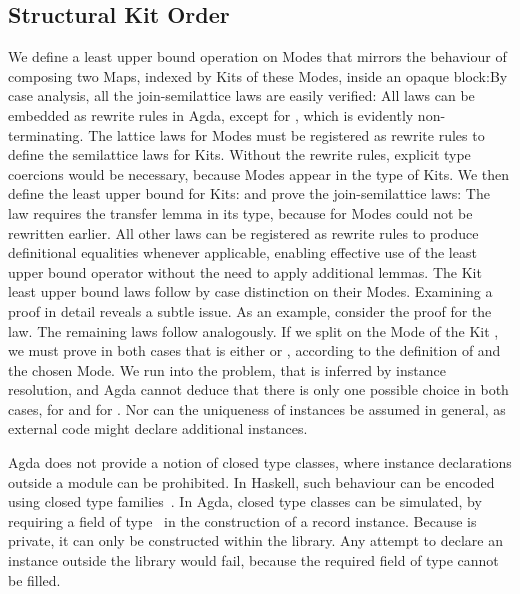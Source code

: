 \documentclass[screen,nonacm]{acmart}
\begin{document}
\subsection{Structural Kit Order}\label{sec:ags-sko}
We define a least upper bound operation on Modes that mirrors the behaviour of
composing two Maps, indexed by Kits of these Modes, inside an opaque
block:\AModeLub{}By case analysis, all the join-semilattice laws are easily
verified: \AModeLubLaws{}All laws can be embedded as rewrite rules in Agda,
except for , which is evidently non-terminating. The
lattice laws for Modes must be registered as rewrite rules to define the
semilattice laws for Kits. Without the rewrite rules, explicit type coercions
would be necessary, because Modes appear in the type of Kits. We then define
the least upper bound for Kits: \AKitLub{}and prove the join-semilattice laws:
\AKitLubLaws{}The  law requires the transfer lemma in its
type, because  for Modes could not be rewritten earlier.
All other laws can be registered as rewrite rules to produce definitional
equalities whenever applicable, enabling effective use of the least upper bound
operator without the need to apply additional lemmas. The Kit least upper bound
laws follow by case distinction on their Modes. Examining a proof in detail
reveals a subtle issue. As an example, consider the proof for the
 law. The remaining laws follow analogously.
\AKitLubExcerpt{}If we split on the Mode  of the Kit
, we must prove in both cases that  is either
 or , according to the definition of
 and the chosen Mode. We run into the problem, that
 is inferred by instance resolution, and Agda cannot deduce that
there is only one possible choice in both cases,  for
 and  for
. Nor can the uniqueness of instances be assumed
in general, as external code might declare additional instances.

Agda does not provide a notion of closed type classes, where instance
declarations outside a module can be prohibited. In Haskell, such behaviour can
be encoded using closed type families~\cite{10.1145/2578855.2535856}. In Agda,
closed type classes can be simulated, by requiring a field \ALockField{} of
type \ALock\ in the construction of a record instance. Because
 is private, it can only be constructed within the library.
Any attempt to declare an instance outside the library would fail, because the
required field  of type  cannot be filled.
\end{document}
